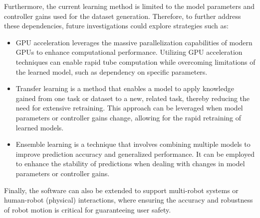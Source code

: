 Furthermore, the current learning method is limited to the model parameters and controller gains used for the dataset generation.
Therefore, to further address these dependencies, future investigations could explore strategies such as:
\begin{itemize}
    \item GPU acceleration leverages the massive parallelization capabilities of modern GPUs to enhance computational performance. 
    Utilizing GPU acceleration techniques can enable rapid tube computation while overcoming limitations of the learned model, such as dependency on specific parameters.
    \item Transfer learning is a method that enables a model to apply knowledge gained from one task or dataset to a new, related task, thereby reducing the need for extensive retraining. 
    This approach can be leveraged when model parameters or controller gains change, allowing for the rapid retraining of learned models.
    \item Ensemble learning is a technique that involves combining multiple models to improve prediction accuracy and generalized performance. 
    It can be employed to enhance the stability of predictions when dealing with changes in model parameters or controller gains.
\end{itemize}

Finally, the software can also be extended to support multi-robot systems or human-robot (physical) interactions, where ensuring the accuracy and robustness of robot motion is critical for guaranteeing user safety.